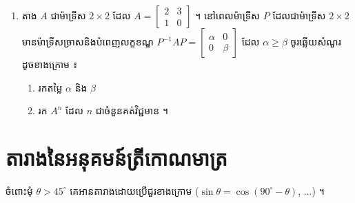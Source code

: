 \begin{enumerate}[1]
\begin{enumerate}[a]
    \item កំណត់រក $A^n$ ។
  \end{enumerate}
  \item តាង $A$ ជាម៉ាទ្រីស $2\times 2$ ដែល $A = \begin{bmatrix} 2 & 3\\ 1 & 0 \end{bmatrix}$ ។ នៅពេលម៉ាទ្រីស $P$ ដែលជាម៉ាទ្រីស $2\times 2$ មានម៉ាទ្រីសច្រាសនិងបំពេញលក្ខខណ្ឌ $P^{-1}AP = \begin{bmatrix} \alpha & 0\\ 0 & \beta \end{bmatrix}$ ដែល $\alpha \ge \beta$ ចូរឆ្លើយសំណួរដូចខាងក្រោម ៖
  \begin{enumerate}[a]
    \item រកតម្លៃ $\alpha$ និង $\beta$
    \item រក $A^n$ ដែល $n$ ជាចំនួនគត់វិជ្ជមាន ។
  \end{enumerate}
\end{enumerate}

\section*{តារាងនៃអនុគមន៍ត្រីកោណមាត្រ}

ចំពោះមុំ $\theta > 45^\circ$ គេអានតារាងដោយប្រើជួរខាងក្រោម ($\sin\theta = \cos(90^\circ - \theta)$, ...) ។

